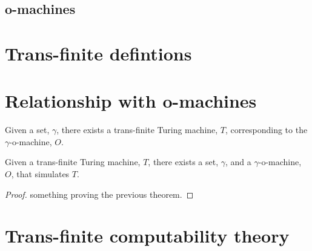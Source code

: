 \documentclass[a4paper]{amsart}
\begin{document}
\subsection{o-machines}

\section{Trans-finite defintions}

\section{Relationship with o-machines}

\begin{theorem}

Given a set, $\gamma$, there exists a trans-finite Turing machine, $T$, corresponding to
the $\gamma$-o-machine, $O$.

\end{theorem}


\begin{theorem}

Given a trans-finite Turing machine, $T$, there exists a set, $\gamma$, and a
$\gamma$-o-machine, $O$, that simulates $T$.

\end{theorem}

\begin{proof}
something proving the previous theorem.
\end{proof}

\section{Trans-finite computability theory}




\end{document}
